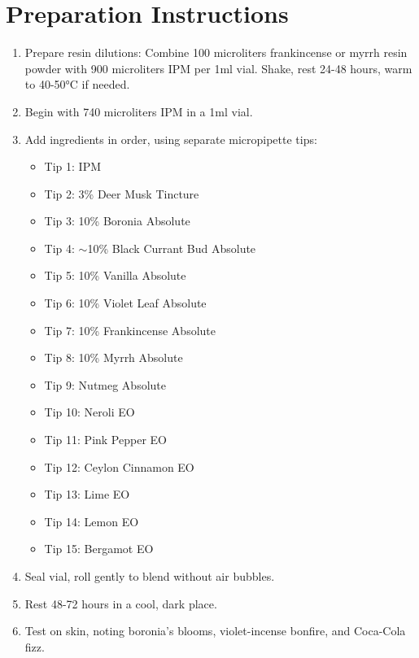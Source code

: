 \documentclass{article}
\begin{document}
\section*{Preparation Instructions}
\begin{enumerate}
  \item Prepare resin dilutions: Combine 100 microliters frankincense or myrrh resin powder with 900 microliters IPM per 1ml vial. Shake, rest 24-48 hours, warm to 40-50°C if needed.
  \item Begin with 740 microliters IPM in a 1ml vial.
  \item Add ingredients in order, using separate micropipette tips:
  \begin{itemize}
    \item Tip 1: IPM
    \item Tip 2: 3\% Deer Musk Tincture
    \item Tip 3: 10\% Boronia Absolute
    \item Tip 4: $\sim$10\% Black Currant Bud Absolute
    \item Tip 5: 10\% Vanilla Absolute
    \item Tip 6: 10\% Violet Leaf Absolute
    \item Tip 7: 10\% Frankincense Absolute
    \item Tip 8: 10\% Myrrh Absolute
    \item Tip 9: Nutmeg Absolute
    \item Tip 10: Neroli EO
    \item Tip 11: Pink Pepper EO
    \item Tip 12: Ceylon Cinnamon EO
    \item Tip 13: Lime EO
    \item Tip 14: Lemon EO
    \item Tip 15: Bergamot EO
  \end{itemize}
  \item Seal vial, roll gently to blend without air bubbles.
  \item Rest 48-72 hours in a cool, dark place.
  \item Test on skin, noting boronia’s blooms, violet-incense bonfire, and Coca-Cola fizz.
\end{enumerate}
\end{document}
